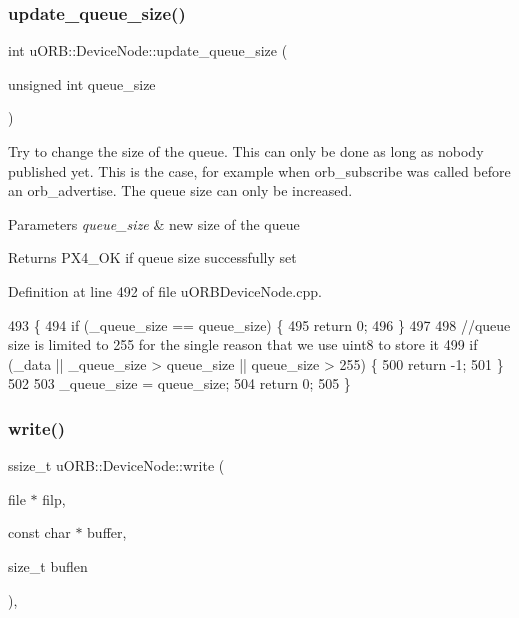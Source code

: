 \subsubsection{\texorpdfstring{update\+\_\+queue\+\_\+size()}{update\_queue\_size()}}
{\footnotesize\ttfamily int u\+O\+R\+B\+::\+Device\+Node\+::update\+\_\+queue\+\_\+size (\begin{DoxyParamCaption}\item[{unsigned int}]{queue\+\_\+size }\end{DoxyParamCaption})}

Try to change the size of the queue. This can only be done as long as nobody published yet. This is the case, for example when orb\+\_\+subscribe was called before an orb\+\_\+advertise. The queue size can only be increased. 
\begin{DoxyParams}{Parameters}
{\em queue\+\_\+size} & new size of the queue \\
\hline
\end{DoxyParams}
\begin{DoxyReturn}{Returns}
P\+X4\+\_\+\+OK if queue size successfully set 
\end{DoxyReturn}


Definition at line 492 of file u\+O\+R\+B\+Device\+Node.\+cpp.


\begin{DoxyCode}
493 \{
494     \textcolor{keywordflow}{if} (\_queue\_size == queue\_size) \{
495         \textcolor{keywordflow}{return} 0;
496     \}
497 
498     \textcolor{comment}{//queue size is limited to 255 for the single reason that we use uint8 to store it}
499     \textcolor{keywordflow}{if} (\_data || \_queue\_size > queue\_size || queue\_size > 255) \{
500         \textcolor{keywordflow}{return} -1;
501     \}
502 
503     \_queue\_size = queue\_size;
504     \textcolor{keywordflow}{return} 0;
505 \}
\end{DoxyCode}
\mbox{\label{classuORB_1_1DeviceNode_ab58b8b4b6cac9fd8aa4d90a85e044c78}} 
\subsubsection{\texorpdfstring{write()}{write()}}
{\footnotesize\ttfamily ssize\+\_\+t u\+O\+R\+B\+::\+Device\+Node\+::write (\begin{DoxyParamCaption}\item[{file $\ast$}]{filp,  }\item[{const char $\ast$}]{buffer,  }\item[{size\+\_\+t}]{buflen }\end{DoxyParamCaption})\hspace{0.3cm}{\ttfamily [override]}, {\ttfamily [virtual]}}

